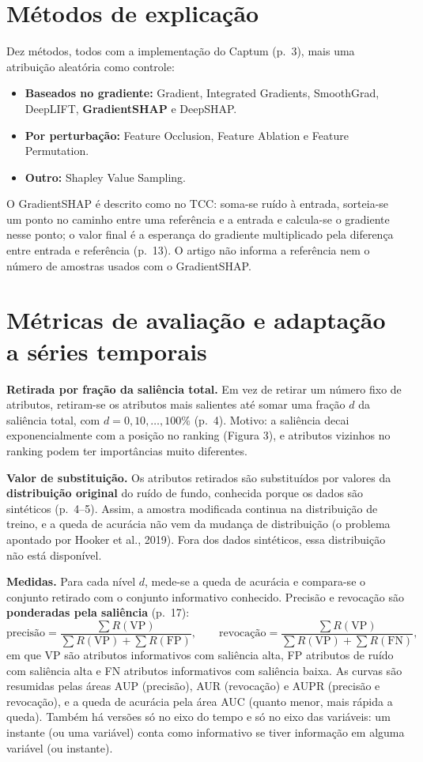\documentclass[11pt,a4paper]{article}
\begin{document}
\section{Métodos de explicação}
Dez métodos, todos com a implementação do Captum (p.~3), mais uma atribuição aleatória como controle:
\begin{itemize}
\item \textbf{Baseados no gradiente:} Gradient, Integrated Gradients, SmoothGrad, DeepLIFT, \textbf{GradientSHAP} e DeepSHAP.
\item \textbf{Por perturbação:} Feature Occlusion, Feature Ablation e Feature Permutation.
\item \textbf{Outro:} Shapley Value Sampling.
\end{itemize}
O GradientSHAP é descrito como no TCC: soma-se ruído à entrada, sorteia-se um ponto no caminho entre uma referência e a entrada e calcula-se o gradiente nesse ponto; o valor final é a esperança do gradiente multiplicado pela diferença entre entrada e referência (p.~13). O artigo não informa a referência nem o número de amostras usados com o GradientSHAP.

\section{Métricas de avaliação e adaptação a séries temporais}
\textbf{Retirada por fração da saliência total.} Em vez de retirar um número fixo de atributos, retiram-se os atributos mais salientes até somar uma fração $d$ da saliência total, com $d = 0, 10, \dots, 100\%$ (p.~4). Motivo: a saliência decai exponencialmente com a posição no ranking (Figura 3), e atributos vizinhos no ranking podem ter importâncias muito diferentes.

\textbf{Valor de substituição.} Os atributos retirados são substituídos por valores da \textbf{distribuição original} do ruído de fundo, conhecida porque os dados são sintéticos (p.~4--5). Assim, a amostra modificada continua na distribuição de treino, e a queda de acurácia não vem da mudança de distribuição (o problema apontado por Hooker et al., 2019). Fora dos dados sintéticos, essa distribuição não está disponível.

\textbf{Medidas.} Para cada nível $d$, mede-se a queda de acurácia e compara-se o conjunto retirado com o conjunto informativo conhecido. Precisão e revocação são \textbf{ponderadas pela saliência} (p.~17):
\[
\text{precisão} = \frac{\sum R(\text{VP})}{\sum R(\text{VP}) + \sum R(\text{FP})}, \qquad
\text{revocação} = \frac{\sum R(\text{VP})}{\sum R(\text{VP}) + \sum R(\text{FN})},
\]
em que VP são atributos informativos com saliência alta, FP atributos de ruído com saliência alta e FN atributos informativos com saliência baixa. As curvas são resumidas pelas áreas AUP (precisão), AUR (revocação) e AUPR (precisão e revocação), e a queda de acurácia pela área AUC (quanto menor, mais rápida a queda). Também há versões só no eixo do tempo e só no eixo das variáveis: um instante (ou uma variável) conta como informativo se tiver informação em alguma variável (ou instante).
\end{document}
